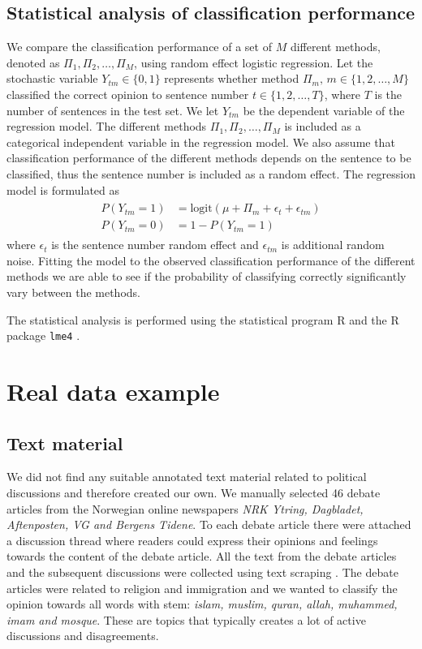 \documentclass[11pt]{article}
\begin{document}
\subsection{Statistical analysis of classification performance}
\label{sec:sa}

We compare the classification performance of a set of $M$ different methods, denoted as $\Pi_1, \Pi_2, \ldots, \Pi_M$, using random effect logistic regression. Let the stochastic variable $Y_{tm} \in \{0,1\}$ represents whether method $\Pi_m, \, m \in \{1,2,\ldots,M\}$ classified the correct opinion to sentence number $t \in \{1,2,\ldots,T\}$, where $T$ is the number of sentences in the test set. We let $Y_{tm}$ be the dependent variable of the regression model. The different methods $\Pi_1, \Pi_2, \ldots, \Pi_M$ is included as a categorical independent variable in the regression model. We also assume that classification performance of the different methods depends on the sentence to be classified, thus the sentence number is included as a random effect. The regression model is formulated as
\begin{align}
  \label{eq:5}
  \begin{split}
    P(Y_{tm} = 1) &= \text{logit}(\mu + \Pi_m + \epsilon_t + \epsilon_{tm}) \\
    P(Y_{tm} = 0) &= 1 - P(Y_{tm} = 1)
  \end{split}
 \end{align}
where $\epsilon_t$ is the sentence number random effect and $\epsilon_{tm}$ is additional random noise. Fitting the model to the observed classification performance of the different methods we are able to see if the probability of classifying correctly significantly vary between the methods.

The statistical analysis is performed using the statistical program R \cite{R} and the R package \verb|lme4| \cite{lme4}.


\section{Real data example}
\label{sec:results}

\subsection{Text material}

We did not find any suitable annotated text material related to political discussions and therefore created our own. We manually selected 46 debate articles from the Norwegian online newspapers \textit{NRK Ytring, Dagbladet, Aftenposten, VG and Bergens Tidene}. To each debate article there were attached a discussion thread where readers could express their opinions and feelings towards the content of the debate article. All the text from the debate articles and the subsequent discussions were collected using text scraping \cite{Hammer13}. The debate articles were related to religion and immigration and we wanted to classify the opinion towards all words with stem: \textit{islam, muslim, quran, allah, muhammed, imam and mosque}. These are topics that typically creates a lot of active discussions and disagreements.
\end{document}
